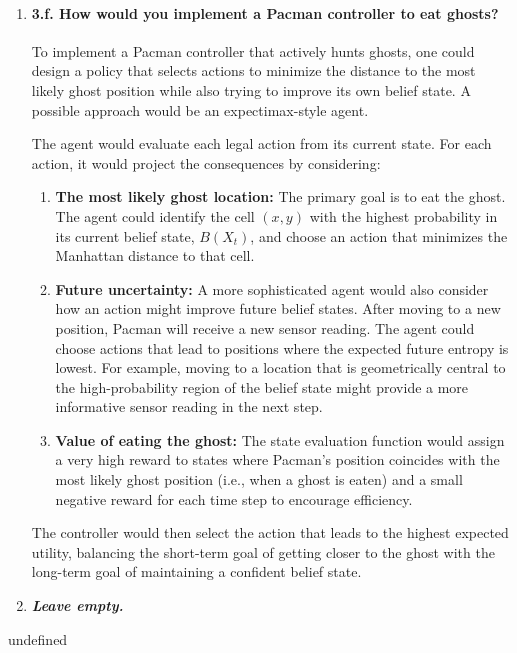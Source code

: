 \begin{enumerate}[label=\alph*.,leftmargin=*]
    \item \paragraph{3.f. How would you implement a Pacman controller to eat ghosts?}
    To implement a Pacman controller that actively hunts ghosts, one could design a policy that selects actions to minimize the distance to the most likely ghost position while also trying to improve its own belief state. A possible approach would be an expectimax-style agent.
    
    The agent would evaluate each legal action from its current state. For each action, it would project the consequences by considering:
    \begin{enumerate}
        \item \textbf{The most likely ghost location:} The primary goal is to eat the ghost. The agent could identify the cell $(x, y)$ with the highest probability in its current belief state, $B(X_t)$, and choose an action that minimizes the Manhattan distance to that cell.
        \item \textbf{Future uncertainty:} A more sophisticated agent would also consider how an action might improve future belief states. After moving to a new position, Pacman will receive a new sensor reading. The agent could choose actions that lead to positions where the expected future entropy is lowest. For example, moving to a location that is geometrically central to the high-probability region of the belief state might provide a more informative sensor reading in the next step.
        \item \textbf{Value of eating the ghost:} The state evaluation function would assign a very high reward to states where Pacman's position coincides with the most likely ghost position (i.e., when a ghost is eaten) and a small negative reward for each time step to encourage efficiency.
    \end{enumerate}
    The controller would then select the action that leads to the highest expected utility, balancing the short-term goal of getting closer to the ghost with the long-term goal of maintaining a confident belief state.
    
    \item \textbf{\textit{Leave empty.}}
\end{enumerate}



undefined